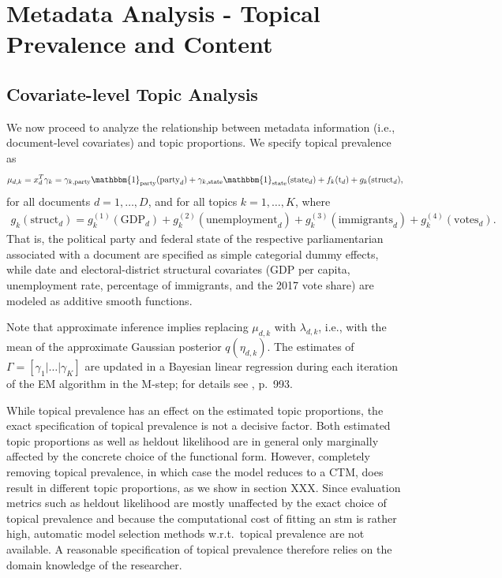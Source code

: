 \section{Metadata Analysis - Topical Prevalence and Content}

\subsection{Covariate-level Topic Analysis}

We now proceed to analyze the relationship between metadata information (i.e., document-level covariates) and topic proportions. We specify topical prevalence as 
\begin{align}
\mu_{d,k} = x_d^T \gamma_k= \gamma_{k,\text{party}} \mathbbm{1}_{\text{party}} (\text{party}_d) + \gamma_{k,\text{state}} \mathbbm{1}_{\text{state}} (\text{state}_d) + f_k(\text{t}_d) + g_k(\text{struct}_d), \label{prevalence}
\end{align} 
for all documents $d = 1,\dots,D$, and for all topics $k = 1,\dots,K$, where 
\begin{align*}
g_k(\text{struct}_d) = g_{k}^{(1)}(\text{GDP}_d)+g_{k}^{(2)}(\text{unemployment}_d)+g_{k}^{(3)}(\text{immigrants}_d)+g_{k}^{(4)}(\text{votes}_d). 
\end{align*} 
That is, the political party and federal state of the respective parliamentarian associated with a document are specified as simple categorial dummy effects, while date and electoral-district structural covariates (GDP per capita, unemployment rate, percentage of immigrants, and the 2017 vote share) are modeled as additive smooth functions.

Note that approximate inference implies replacing $\mu_{d,k}$ with $\lambda_{d,k}$, i.e., with the mean of the approximate Gaussian posterior $q(\eta_{d,k})$. The estimates of $\Gamma = [\gamma_1 | \dots | \gamma_K]$ are updated in a Bayesian linear regression during each iteration of the EM algorithm in the M-step; for details see \cite{roberts2013structural}, p.\ 993.

While topical prevalence has an effect on the estimated topic proportions, the exact specification of topical prevalence is not a decisive factor. Both estimated topic proportions as well as heldout likelihood are in general only marginally affected by the concrete choice of the functional form. However, completely removing topical prevalence, in which case the model reduces to a CTM, does result in different topic proportions, as we show in section XXX. Since evaluation metrics such as heldout likelihood are mostly unaffected by the exact choice of topical prevalence and because the computational cost of fitting an stm is rather high, automatic model selection methods w.r.t.\ topical prevalence are not available. A reasonable specification of topical prevalence therefore relies on the domain knowledge of the researcher.

